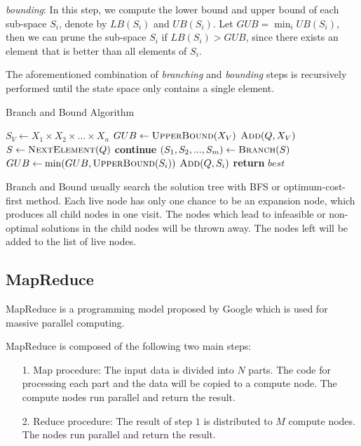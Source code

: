 \noindent \textit{bounding}: In this step, we compute the lower bound and upper bound of each sub-space $S_i$, denote by $LB(S_i)$ and $UB(S_i)$. Let $GUB=\min_{i}UB(S_i)$, then we can prune the sub-space $S_i$ if $LB(S_i)>GUB$, since there exists an element that is better than all elements of $S_i$.

The aforementioned combination of \textit{branching} and \textit{bounding} steps is recursively performed until the state space only contains a single element.

\begin{algorithm}[h]
\caption{Branch and Bound Algorithm}
\begin{algorithmic}[1]
    \State $S_V \gets X_1\times X_2\times\dots\times X_n$
    \State $GUB \gets \textsc{UpperBound}(X_V)$
    \State $\textsc{Add}(Q,X_V)$
        \State $S \gets \textsc{NextElement}(Q)$
            \State \textbf{continue}
        \EndIf
        \State $(S_1,S_2,...,S_m) \gets \textsc{Branch}(S)$
            \State $GUB \gets \min(GUB, \textsc{UpperBound}(S_i))$
        \EndFor
                \State $\textsc{Add}(Q, S_i)$
            \EndIf
        \EndFor
    \EndWhile
    \State \textbf{return }$best$
\EndFunction
\end{algorithmic}
\end{algorithm}

Branch and Bound usually search the solution tree with BFS or optimum-cost-first method. Each live node has only one chance to be an expansion node, which produces all child nodes in one visit. The nodes which lead to infeasible or non-optimal solutions in the child nodes will be thrown away. The nodes left will be added to the list of live nodes.

\subsection{MapReduce}
MapReduce is a programming model proposed by Google which is used for massive parallel computing.

MapReduce is composed of the following two main steps:
\begin{itemize}
\item[1.]	Map procedure: The input data is divided into $N$ parts. The code for processing each part and the data will be copied to a compute node. The compute nodes run parallel and return the result.
\item[2.]	Reduce procedure: The result of step $1$ is distributed to $M$ compute nodes. The nodes run parallel and return the result.
\end{itemize}

